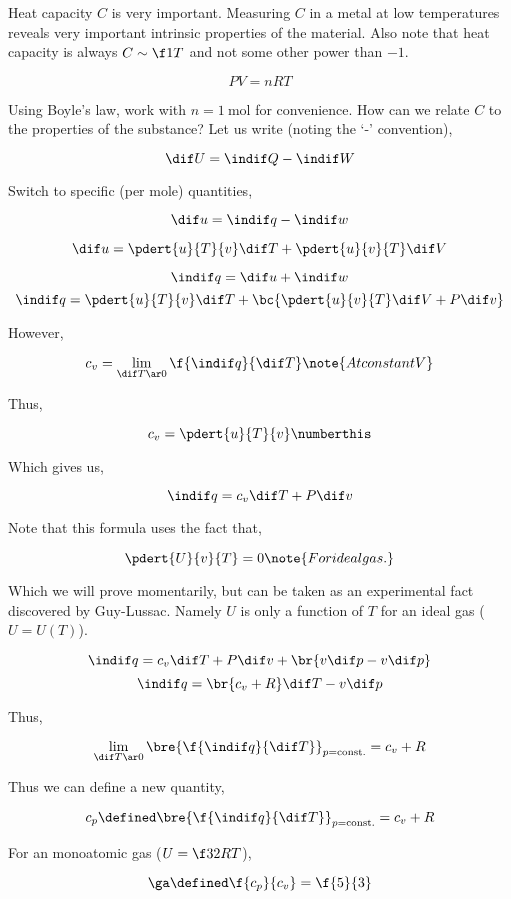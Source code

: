 \documentclass{article}
\begin{document}
Heat capacity $C$ is very important. Measuring $C$ in a metal at low temperatures reveals very important intrinsic properties of the material. Also note that heat capacity is always $C \sim \f1T$ and not some other power than $-1$.


\[ PV = nRT \]

Using Boyle's law, work with $n = \SI{1}{\mole}$ for convenience. How can we relate $C$ to the properties of the substance? Let us write (noting the `-' convention),

\[ \dif U = \indif Q - \indif W \]

Switch to specific (per mole) quantities,

\[ \dif u = \indif q - \indif w \]

\[ \dif u = \pdert{u}{T}{v} \dif T + \pdert{u}{v}{T} \dif V \]

\[ \indif q = \dif u + \indif w \]
\[ \indif q = \pdert{u}{T}{v} \dif T + \bc{\pdert{u}{v}{T} \dif V + P\dif v} \]

However,

\[ c_v = \lim_{\dif T \ar 0} \f{\indif q}{\dif T} \note{At constant V} \]

Thus,

\[ c_v = \pdert{u}{T}{v} \numberthis \label{eq:heatcapacity} \]

Which gives us,

\[ \indif q = c_v \dif T  + P\dif v \]

Note that this formula uses the fact that,

\[ \pdert{U}{v}{T} = 0 \note{For ideal gas.} \]

Which we will prove momentarily, but can be taken as an experimental fact discovered by Guy-Lussac. Namely $U$ is only a function of $T$ for an ideal gas ($U = U(T)$).

\[ \indif q = c_v \dif T  + P\dif v + \br{ v \dif p  - v\dif p} \]
\[ \indif q = \br{c_v + R} \dif T  - v\dif p \]

Thus,

\[ \lim_{\dif T \ar 0} \bre{\f{\indif q}{\dif T}}_{p=\text{const.}} = c_v + R \]

Thus we can define a new quantity,

\[ c_p \defined \bre{\f{\indif q}{\dif T}}_{p=\text{const.}} = c_v + R \]

For an monoatomic gas ($U = \f32 RT$),

\[ \ga \defined \f{c_p}{c_v} = \f{5}{3} \]
\end{document}
